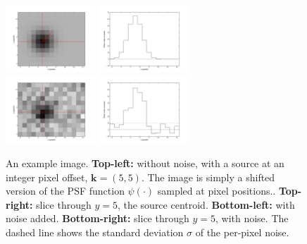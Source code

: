 \documentclass[letterpaper,preprint]{aastex}
\newcommand{\figpart}[1]{\textbf{#1}}
\renewcommand{\vec}[1]{\boldsymbol{#1}}
\newcommand{\kvec}{\vec{k}}
\newcommand{\coord}[2]{(#1, #2)}
\begin{document}
\begin{figure}[htb]
\begin{center}
\includegraphics[width=0.3\textwidth]{f02d-bw}
\includegraphics[width=0.3\textwidth]{f02g-bw} \\
\includegraphics[width=0.3\textwidth]{f02e-bw}
\includegraphics[width=0.3\textwidth]{f02h-bw}
\end{center}
\caption{An example image.  \figpart{Top-left:} without noise, with a
  source at an integer pixel offset, $\kvec = \coord{5}{5}$.  The
  image is simply a shifted version of the PSF function $\psi(\cdot)$
  sampled at pixel positions..  \figpart{Top-right:} slice through $y
  = 5$, the source centroid.  \figpart{Bottom-left:} with noise added.
  \figpart{Bottom-right:} slice through $y = 5$, with noise.  The
  dashed line shows the standard deviation $\sigma$ of the per-pixel
  noise.
\label{fig:image}}
\end{figure}
\end{document}
